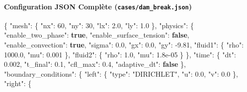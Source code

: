 \documentclass[
  10pt,
]{article}
\newenvironment{Shaded}{}{}
\newcommand{\DataTypeTok}[1]{\textcolor[rgb]{0.56,0.13,0.00}{#1}}
\newcommand{\DecValTok}[1]{\textcolor[rgb]{0.25,0.63,0.44}{#1}}
\newcommand{\FloatTok}[1]{\textcolor[rgb]{0.25,0.63,0.44}{#1}}
\newcommand{\FunctionTok}[1]{\textcolor[rgb]{0.02,0.16,0.49}{#1}}
\newcommand{\KeywordTok}[1]{\textcolor[rgb]{0.00,0.44,0.13}{\textbf{#1}}}
\newcommand{\StringTok}[1]{\textcolor[rgb]{0.25,0.44,0.63}{#1}}
\begin{document}
\paragraph{\texorpdfstring{Configuration JSON Complète
(\texttt{cases/dam\_break.json})}{Configuration JSON Complète (cases/dam\_break.json)}}\label{configuration-json-compluxe8te-casesdam_break.json}

\begin{Shaded}
\begin{Highlighting}[]
\FunctionTok{\{}
  \DataTypeTok{"mesh"}\FunctionTok{:} \FunctionTok{\{}
    \DataTypeTok{"nx"}\FunctionTok{:} \DecValTok{60}\FunctionTok{,}
    \DataTypeTok{"ny"}\FunctionTok{:} \DecValTok{30}\FunctionTok{,}
    \DataTypeTok{"lx"}\FunctionTok{:} \FloatTok{2.0}\FunctionTok{,}
    \DataTypeTok{"ly"}\FunctionTok{:} \FloatTok{1.0}
  \FunctionTok{\},}
  \DataTypeTok{"physics"}\FunctionTok{:} \FunctionTok{\{}
    \DataTypeTok{"enable\_two\_phase"}\FunctionTok{:} \KeywordTok{true}\FunctionTok{,}
    \DataTypeTok{"enable\_surface\_tension"}\FunctionTok{:} \KeywordTok{false}\FunctionTok{,}
    \DataTypeTok{"enable\_convection"}\FunctionTok{:} \KeywordTok{true}\FunctionTok{,}
    \DataTypeTok{"sigma"}\FunctionTok{:} \FloatTok{0.0}\FunctionTok{,}
    \DataTypeTok{"gx"}\FunctionTok{:} \FloatTok{0.0}\FunctionTok{,}
    \DataTypeTok{"gy"}\FunctionTok{:} \FloatTok{{-}9.81}\FunctionTok{,}
    \DataTypeTok{"fluid1"}\FunctionTok{:} \FunctionTok{\{}
      \DataTypeTok{"rho"}\FunctionTok{:} \FloatTok{1000.0}\FunctionTok{,}
      \DataTypeTok{"mu"}\FunctionTok{:} \FloatTok{0.001}
    \FunctionTok{\},}
    \DataTypeTok{"fluid2"}\FunctionTok{:} \FunctionTok{\{}
      \DataTypeTok{"rho"}\FunctionTok{:} \FloatTok{1.0}\FunctionTok{,}
      \DataTypeTok{"mu"}\FunctionTok{:} \FloatTok{1.8e{-}05}
    \FunctionTok{\}}
  \FunctionTok{\},}
  \DataTypeTok{"time"}\FunctionTok{:} \FunctionTok{\{}
    \DataTypeTok{"dt"}\FunctionTok{:} \FloatTok{0.002}\FunctionTok{,}
    \DataTypeTok{"t\_final"}\FunctionTok{:} \FloatTok{0.1}\FunctionTok{,}
    \DataTypeTok{"cfl\_max"}\FunctionTok{:} \FloatTok{0.4}\FunctionTok{,}
    \DataTypeTok{"adaptive\_dt"}\FunctionTok{:} \KeywordTok{false}
  \FunctionTok{\},}
  \DataTypeTok{"boundary\_conditions"}\FunctionTok{:} \FunctionTok{\{}
    \DataTypeTok{"left"}\FunctionTok{:} \FunctionTok{\{}
      \DataTypeTok{"type"}\FunctionTok{:} \StringTok{"DIRICHLET"}\FunctionTok{,}
      \DataTypeTok{"u"}\FunctionTok{:} \FloatTok{0.0}\FunctionTok{,}
      \DataTypeTok{"v"}\FunctionTok{:} \FloatTok{0.0}
    \FunctionTok{\},}
    \DataTypeTok{"right"}\FunctionTok{:} \FunctionTok{\{}

\end{Highlighting}
\end{Shaded}
\end{document}
